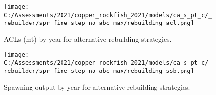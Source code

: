 \documentclass[11pt,
  english,
  a4paper,
]{article}
\begin{document}
\tagmcend\tagstructend


\begin{figure}
\centering
\texttt{[image: C:/Assessments/2021/copper\_rockfish\_2021/models/ca\_s\_pt\_c/\_rebuilder/spr\_fine\_step\_no\_abc\_max/rebuilding\_acl.png]}
\caption{ACLs (mt) by year for alternative rebuilding strategies.\label{fig:catch-fig}}
\end{figure}

\tagmcend\tagstructend


\begin{figure}
\centering
\texttt{[image: C:/Assessments/2021/copper\_rockfish\_2021/models/ca\_s\_pt\_c/\_rebuilder/spr\_fine\_step\_no\_abc\_max/rebuilding\_ssb.png]}
\caption{Spawning output by year for alternative rebuilding strategies.\label{fig:ssb-fig}}
\end{figure}

\tagmcend\tagstructend
\end{document}
